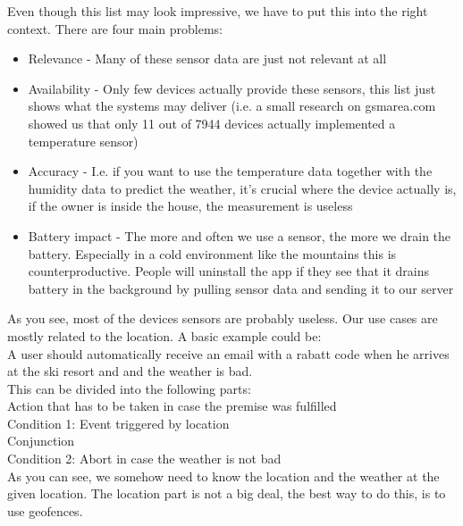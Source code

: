 \documentclass[11pt]{article} %
\begin{document}
\vspace{0.5cm}

Even though this list may look impressive, we have to put this into the right context. There are four main problems:

\begin{itemize}
  \item Relevance - Many of these sensor data are just not relevant at all
  \item Availability - Only few devices actually provide these sensors, this list just shows what the systems may deliver (i.e. a small research on gsmarea.com showed us that only 11 out of 7944 devices actually implemented a temperature sensor)
 \item Accuracy - I.e. if you want to use the temperature data together with the humidity data to predict the weather, it’s crucial where the device actually is, if the owner is inside the house, the measurement is useless
 \item Battery impact - The more and often we use a sensor, the more we drain the battery. Especially in a cold environment like the mountains this is counterproductive. People will uninstall the app if they see that it drains battery in the background by pulling sensor data and sending it to our server
\end{itemize}

As you see, most of the devices sensors are probably useless. Our use cases are mostly related to the location. A basic example could be:\\

\colorbox{blue!30}{A user should automatically receive an email with a rabatt code}
\colorbox{green!30}{when he arrives at the ski resort}
\colorbox{orange!30}{and}
\colorbox{red!30}{ and the weather is bad.}\\

This can be divided into the following parts:\\

\colorbox{blue!30}{  } Action that has to be taken in case the premise was fulfilled\\
\colorbox{green!30}{  } Condition 1: Event triggered by location\\
\colorbox{orange!30}{  } Conjunction\\
\colorbox{red!30}{  } Condition 2: Abort in case the weather is not bad\\

As you can see, we somehow need to know the location and the weather at the given location. The location part is not a big deal, the best way to do this, is to use geofences.
\end{document}
